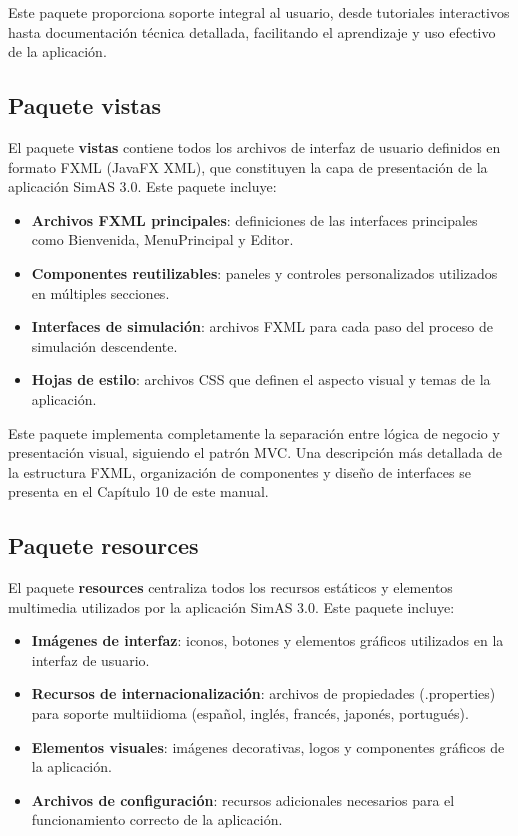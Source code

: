 Este paquete proporciona soporte integral al usuario, desde tutoriales interactivos hasta documentación técnica detallada, facilitando el aprendizaje y uso efectivo de la aplicación.

\subsection{Paquete vistas}

El paquete \textbf{vistas} contiene todos los archivos de interfaz de usuario definidos en formato FXML (JavaFX XML), que constituyen la capa de presentación de la aplicación SimAS 3.0. Este paquete incluye:

\begin{itemize}
    \item \textbf{Archivos FXML principales}: definiciones de las interfaces principales como Bienvenida, MenuPrincipal y Editor.
    \item \textbf{Componentes reutilizables}: paneles y controles personalizados utilizados en múltiples secciones.
    \item \textbf{Interfaces de simulación}: archivos FXML para cada paso del proceso de simulación descendente.
    \item \textbf{Hojas de estilo}: archivos CSS que definen el aspecto visual y temas de la aplicación.
\end{itemize}

Este paquete implementa completamente la separación entre lógica de negocio y presentación visual, siguiendo el patrón MVC. Una descripción más detallada de la estructura FXML, organización de componentes y diseño de interfaces se presenta en el Capítulo 10 de este manual.

\subsection{Paquete resources}

El paquete \textbf{resources} centraliza todos los recursos estáticos y elementos multimedia utilizados por la aplicación SimAS 3.0. Este paquete incluye:

\begin{itemize}
    \item \textbf{Imágenes de interfaz}: iconos, botones y elementos gráficos utilizados en la interfaz de usuario.
    \item \textbf{Recursos de internacionalización}: archivos de propiedades (.properties) para soporte multiidioma (español, inglés, francés, japonés, portugués).
    \item \textbf{Elementos visuales}: imágenes decorativas, logos y componentes gráficos de la aplicación.
    \item \textbf{Archivos de configuración}: recursos adicionales necesarios para el funcionamiento correcto de la aplicación.
\end{itemize}

